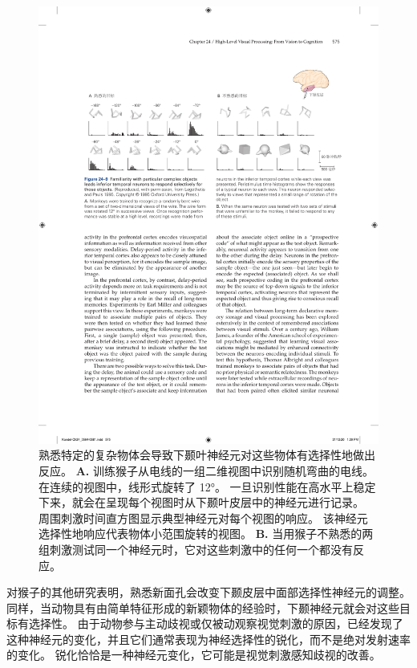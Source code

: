 \begin{figure}[htbp]
	\centering
	\includegraphics[width=1.0\linewidth]{chap24/fig_24_9}
	\caption{熟悉特定的复杂物体会导致下颞叶神经元对这些物体有选择性地做出反应。
		\textbf{A.} 训练猴子从电线的一组二维视图中识别随机弯曲的电线。 在连续的视图中，线形式旋转了 12°。
		一旦识别性能在高水平上稳定下来，就会在呈现每个视图时从下颞叶皮层中的神经元进行记录。
		周围刺激时间直方图显示典型神经元对每个视图的响应。
		该神经元选择性地响应代表物体小范围旋转的视图。
		\textbf{B.} 当用猴子不熟悉的两组刺激测试同一个神经元时，它对这些刺激中的任何一个都没有反应。}
	\label{fig:24_9}
\end{figure}


对猴子的其他研究表明，熟悉新面孔会改变下颞皮层中面部选择性神经元的调整。
同样，当动物具有由简单特征形成的新颖物体的经验时，下颞神经元就会对这些目标有选择性。
由于动物参与主动歧视或仅被动观察视觉刺激的原因，已经发现了这种神经元的变化，并且它们通常表现为神经选择性的锐化，而不是绝对发射速率的变化。
锐化恰恰是一种神经元变化，它可能是视觉刺激感知歧视的改善。



